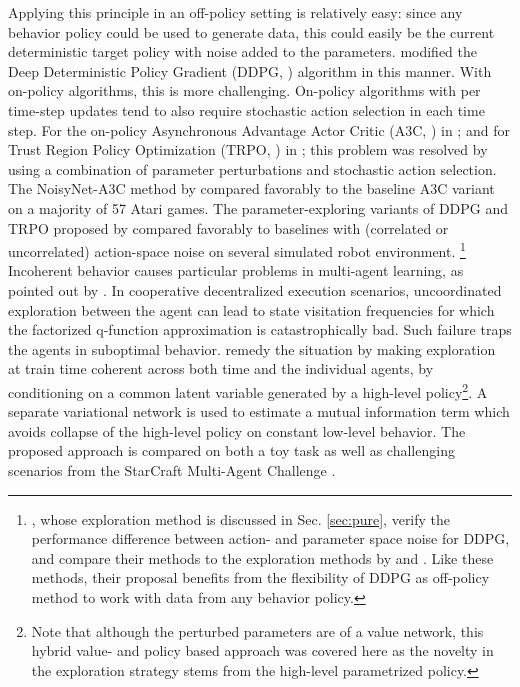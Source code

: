 Applying this principle in an off-policy setting is relatively easy: since any behavior policy could be used to generate data, this could easily be the current deterministic target policy with noise added to the parameters.  modified the Deep Deterministic Policy Gradient (DDPG, \citealt{lillicrap2016continuous}) algorithm in this manner. With on-policy algorithms, this is more challenging. On-policy algorithms with per time-step updates tend to also require stochastic action selection in each time step. For the on-policy Asynchronous Advantage Actor Critic (A3C, \citealt{mnih2016asynchronous}) in ; and for Trust Region Policy Optimization (TRPO, \citealt{schulman2015trust}) in ; this problem was resolved by using a combination of parameter perturbations and stochastic action selection.
The NoisyNet-A3C method by  compared favorably to the baseline A3C variant on a majority of 57 Atari games.
The parameter-exploring variants of DDPG and TRPO proposed by 
 compared favorably to baselines with (correlated or uncorrelated) action-space noise on several simulated robot environment. 
\footnote{, whose exploration method is discussed in Sec. \ref{sec:pure}, verify the performance difference between action- and parameter space noise for DDPG, and compare their methods to the exploration methods by  and . Like these methods, their proposal benefits from the flexibility of DDPG as off-policy method to work with data from any behavior policy.}
Incoherent behavior causes particular problems in multi-agent learning, as pointed out by . In cooperative decentralized execution scenarios, uncoordinated exploration between the agent can lead to state visitation frequencies for which the factorized q-function approximation is catastrophically bad. Such failure traps the agents in suboptimal behavior.  remedy the situation by making exploration at train time coherent across both time and the individual agents, by conditioning on a common latent variable generated by a high-level policy\footnote{Note that although the perturbed parameters are of a value network, this hybrid value- and policy based approach was covered here as the novelty in the exploration strategy stems from the high-level parametrized policy.}. A separate variational network is used to estimate a mutual information term which avoids collapse of the high-level policy on constant low-level behavior. The proposed approach is compared on both a toy task as well as challenging scenarios from the StarCraft Multi-Agent Challenge .

